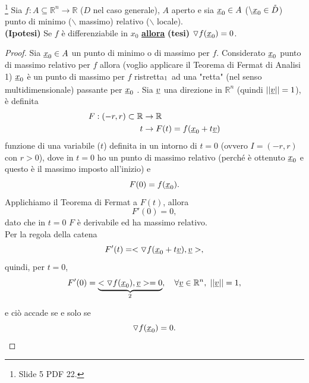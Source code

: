 \begin{theorem}[di Fermat]\label{th:fermat_an2}\footnote{Slide 5 PDF 22.}
	Sia $f:A\subseteq\mathbb{R}^n\rightarrow\mathbb{R}$ ($D$ nel caso generale), $A$ aperto e sia $\uline x_0\in A$ ($\backslash \uline x_0\in \mathring D$) punto di minimo ($\backslash$ massimo) relativo ($\backslash$ locale).\\
	\textbf{(Ipotesi)} Se $f$ è differenziabile in $x_0$ \textbf{\ul{allora}} \textbf{(tesi)} $\triangledown f(\uline x_0)=0$.
\end{theorem}

\begin{proof}
	Sia $\uline x_0\in A$ un punto di minimo o di massimo per $f$. Considerato $\uline x_0$ punto di massimo relativo per $f$ allora (voglio applicare il Teorema di Fermat di Analisi 1) $\uline x_0$ è un punto di massimo per $f$ ristretta$_{\footnotemark}$ ad una "retta" (nel senso multidimensionale) passante per $\uline x_0$ \footnotemark . Sia $\uline v$ una direzione in $\mathbb{R}^n$ (quindi $||\uline v||=1$), è definita
	\begin{equation*}
		\begin{aligned}
			F:(-r,r)\subset\mathbb{R}&\rightarrow\mathbb{R}\\
			t&\rightarrow F(t)=f(\uline x_0 + t\uline v)
		\end{aligned}
	\end{equation*}
	\footnotemark  funzione di una variabile ($t$) definita in un intorno di $t=0$ (ovvero $I=(-r,r)$ con $r>0$), dove in $t=0$ ho un punto di massimo relativo (perché è ottenuto $\uline x_0$ e questo è il massimo imposto all'inizio) e
	\begin{equation*}
		F(0) = f(\uline x_0).
	\end{equation*}
	\footnotemark Applichiamo il Teorema di Fermat a $F(t)$, allora
	\begin{equation*}
		F'(0) = 0,
	\end{equation*}
	dato che in $t=0$ $F$ è derivabile ed ha massimo relativo.\\
	Per la regola della catena
	\begin{equation*}
		F'(t) = <\triangledown f(\uline x_0 + t\uline v), \uline v>,
	\end{equation*}
	quindi, per $t=0$,
	\begin{equation}\label{eq:derivata_direzionale_0_fermat}
		F'(0) = \underbrace{<\triangledown f(\uline x_0),\uline v> = 0}_{\footnotemark},\quad\forall\uline v\in\mathbb{R}^n,\; ||\uline v|| = 1,
	\end{equation}
	e ciò accade se e solo se
	\begin{equation}\label{eq:gradiente_0_fermat}
		\triangledown f(\uline x_0) = 0.
	\end{equation}
\end{proof}

